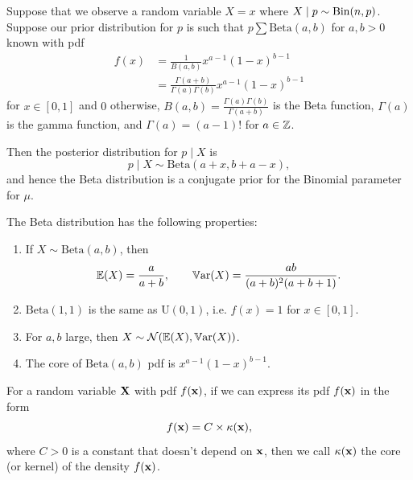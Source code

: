 \documentclass[10pt, a4paper]{article}
\begin{document}
\begin{theorem}
    Suppose that we observe a random variable $X = x$ where $X \mid p \sim \operatorname{Bin}(n, p)$.
    Suppose our prior distribution for $p$ is such that $p \sum \mathrm{Beta}(a, b)$ for $a, b > 0$ known with pdf
    \begin{align*}
        f(x) &= \frac{1}{B(a, b)}x ^ {a - 1}(1 - x) ^ {b - 1} \\
        &= \frac{\Gamma(a + b)}{\Gamma(a)\Gamma(b)}x ^ {a - 1}(1 - x) ^ {b - 1}
    \end{align*}
    for $x \in [0, 1]$ and $0$ otherwise,
    $B(a, b) = \frac{\Gamma(a)\Gamma(b)}{\Gamma(a + b)}$ is the Beta function,
    $\Gamma(a)$ is the gamma function,
    and $\Gamma(a) = (a - 1)!$ for $a \in \mathbb{Z}$.

    Then the posterior distribution for $p \mid X$ is
    \[
    p \mid X \sim \mathrm{Beta}(a + x, b + a - x),
    \]
    and hence the Beta distribution is a conjugate prior for the Binomial parameter for $\mu$.
\end{theorem}

\begin{remark}
    The Beta distribution has the following properties:

    \begin{enumerate}[label = (\roman*)]
        \item If $X \sim \mathrm{Beta}(a, b)$,
        then
        \[
        \mathbb{E}(X) = \frac{a}{a + b},\qquad\mathbb{V}\mathrm{ar}(X) = \frac{ab}{(a + b) ^ 2(a + b + 1)}.
        \]

        \item $\mathrm{Beta}(1, 1)$ is the same as $\mathrm{U}(0, 1)$,
        i.e. $f(x) = 1$ for $x \in [0, 1]$.

        \item For $a, b$ large,
        then $X \sim \mathcal{N}(\mathbb{E}(X), \mathbb{V}\mathrm{ar}(X))$.

        \item The core of $\mathrm{Beta}(a, b)$ pdf is $x ^ {a - 1}(1 - x) ^ {b - 1}$.
    \end{enumerate}
\end{remark}

\begin{definition}
    For a random variable $\mathbf{X}$ with pdf $f(\mathbf{x})$,
    if we can express its pdf $f(\mathbf{x})$ in the form
    \[
    f(\mathbf{x}) = C \times \kappa(\mathbf{x}),
    \]
    where $C > 0$ is a constant that doesn't depend on $\mathbf{x}$,
    then we call $\kappa(\mathbf{x})$ the core
    (or kernel)
    of the density $f(\mathbf{x})$.
\end{definition}
\end{document}
